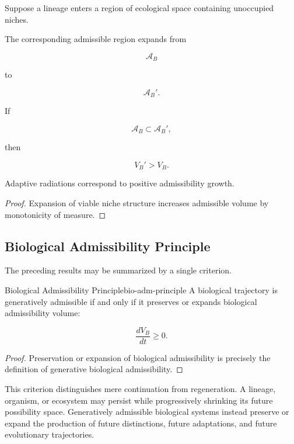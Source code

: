 \documentclass[12pt,twoside,openright]{book}
\newenvironment{prop}
{\begin{proposition}{}{}}
{\end{proposition}}
\begin{document}
Suppose a lineage enters a region of ecological space
containing unoccupied niches.

The corresponding admissible region expands from

\[
\mathcal A_B
\]

to

\[
\mathcal A_B'.
\]

If

\[
\mathcal A_B
\subset
\mathcal A_B',
\]

then

\[
V_B'
>
V_B.
\]

\begin{prop}
Adaptive radiations correspond to positive admissibility
growth.
\end{prop}

\begin{proof}
Expansion of viable niche structure increases admissible
volume by monotonicity of measure.
\end{proof}

\subsection{ Biological Admissibility Principle}

The preceding results may be summarized by a single
criterion.

\begin{theorem}{Biological Admissibility Principle}{bio-adm-principle}
A biological trajectory is generatively admissible if and
only if it preserves or expands biological admissibility
volume:

\[
\frac{dV_B}{dt}
\ge0.
\]
\end{theorem}

\begin{proof}
Preservation or expansion of biological admissibility is
precisely the definition of generative biological
admissibility.
\end{proof}

This criterion distinguishes mere continuation from
regeneration. A lineage, organism, or ecosystem may
persist while progressively shrinking its future
possibility space. Generatively admissible biological
systems instead preserve or expand the production of
future distinctions, future adaptations, and future
evolutionary trajectories.

\end{document}
